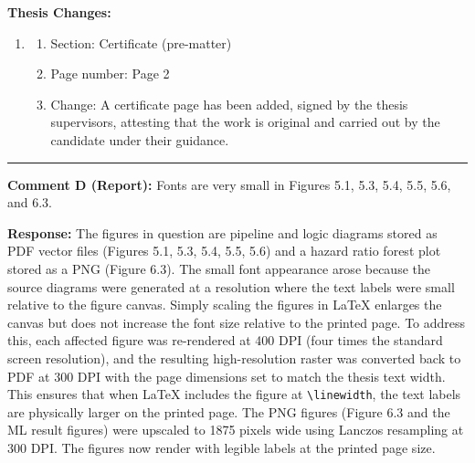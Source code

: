 \documentclass[12pt,a4paper]{article}
\begin{document}
\begin{flushleft}
\textbf{Thesis Changes:}
\begin{enumerate}
    \item
    \begin{enumerate}
        \item Section: Certificate (pre-matter)
        \item Page number: Page 2
        \item Change: A certificate page has been added, signed by the thesis supervisors, attesting that the work is original and carried out by the candidate under their guidance.
    \end{enumerate}
\end{enumerate}

\vspace{\baselineskip}

\hrule

\vspace{\baselineskip}

\textbf{Comment D (Report):} Fonts are very small in Figures 5.1, 5.3, 5.4, 5.5, 5.6, and 6.3.

\vspace{\baselineskip}

\textbf{Response:} The figures in question are pipeline and logic diagrams stored as PDF vector files (Figures 5.1, 5.3, 5.4, 5.5, 5.6) and a hazard ratio forest plot stored as a PNG (Figure 6.3). The small font appearance arose because the source diagrams were generated at a resolution where the text labels were small relative to the figure canvas. Simply scaling the figures in LaTeX enlarges the canvas but does not increase the font size relative to the printed page. To address this, each affected figure was re-rendered at 400 DPI (four times the standard screen resolution), and the resulting high-resolution raster was converted back to PDF at 300 DPI with the page dimensions set to match the thesis text width. This ensures that when LaTeX includes the figure at \texttt{\textbackslash linewidth}, the text labels are physically larger on the printed page. The PNG figures (Figure 6.3 and the ML result figures) were upscaled to 1875 pixels wide using Lanczos resampling at 300 DPI. The figures now render with legible labels at the printed page size.

\vspace{\baselineskip}


\end{flushleft}
\end{document}

